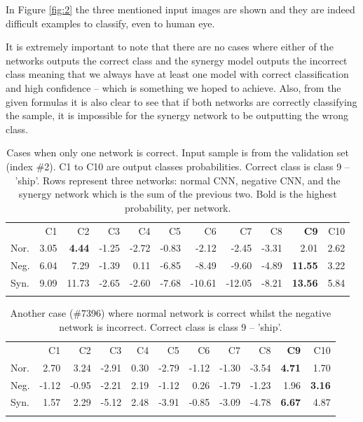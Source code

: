 \documentclass[b5paper]{book}
\begin{document}
In Figure \ref{fig:2} the three mentioned input images are shown and they are indeed difficult examples to classify, even to human eye.

It is extremely important to note that there are no cases where either of the networks outputs the correct class and the synergy model outputs the incorrect class meaning that we always have at least one model with correct classification and high confidence -- which is something we hoped to achieve. Also, from the given formulas it is also clear to see that if both networks are correctly classifying the sample, it is impossible for the synergy network to be outputting the wrong class.


\begin{table}
\centering
\caption{Cases when only one network is correct. Input sample is from the validation set (index \#2). C1 to C10 are output classes probabilities. Correct class is class 9 -- 'ship'. Rows represent three networks: normal CNN, negative CNN, and the synergy network which is the sum of the previous two. Bold is the highest probability, per network.}
\label{tab:3}
\tabcolsep=0.04cm
\begin{tabular}{lrrrrrrrrrr}
\hline\noalign{\smallskip}
 & C1 & C2 & C3 & C4 & C5 & C6 & C7 & C8 & \textbf{C9} & C10 \\
\noalign{\smallskip}\hline\noalign{\smallskip}
Nor. & 3.05 & \textbf{4.44} & -1.25 & -2.72 & -0.83 & -2.12 & -2.45 & -3.31 & 2.01 & 2.62 \\
Neg. & 6.04 & 7.29 & -1.39 & 0.11 & -6.85 & -8.49 & -9.60 & -4.89 & \textbf{11.55} & 3.22 \\
Syn. & 9.09 & 11.73 & -2.65 & -2.60 & -7.68 & -10.61 & -12.05 & -8.21 & \textbf{13.56} & 5.84 \\
\noalign{\smallskip}\hline
\end{tabular}
\end{table}

\begin{table}
\centering
\caption{Another case (\#7396) where normal network is correct whilst the negative network is incorrect. Correct class is class 9 -- 'ship'.}
\label{tab:4}
\tabcolsep=0.06cm
\begin{tabular}{lrrrrrrrrrr}
\hline\noalign{\smallskip}
 & C1 & C2 & C3 & C4 & C5 & C6 & C7 & C8 & \textbf{C9} & C10 \\
\noalign{\smallskip}\hline\noalign{\smallskip}
Nor. & 2.70 & 3.24 & -2.91 & 0.30 & -2.79 & -1.12 & -1.30 & -3.54 & \textbf{4.71} & 1.70 \\
Neg. & -1.12 & -0.95 & -2.21 & 2.19 & -1.12 & 0.26 & -1.79 & -1.23 & 1.96 & \textbf{3.16} \\
Syn. & 1.57 & 2.29 & -5.12 & 2.48 & -3.91 & -0.85 & -3.09 & -4.78 & \textbf{6.67} & 4.87 \\
\noalign{\smallskip}\hline
\end{tabular}
\end{table}
\end{document}
